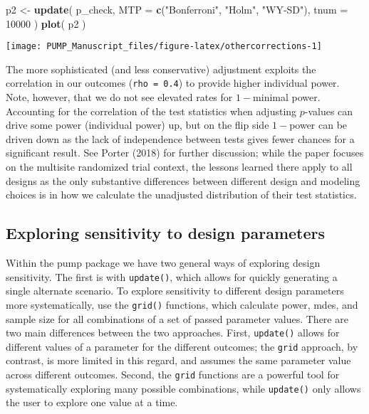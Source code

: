 \documentclass[
]{article}
\newenvironment{Shaded}{\begin{snugshade}}{\end{snugshade}}
\newcommand{\DataTypeTok}[1]{\textcolor[rgb]{0.13,0.29,0.53}{#1}}
\newcommand{\DecValTok}[1]{\textcolor[rgb]{0.00,0.00,0.81}{#1}}
\newcommand{\KeywordTok}[1]{\textcolor[rgb]{0.13,0.29,0.53}{\textbf{#1}}}
\newcommand{\NormalTok}[1]{#1}
\newcommand{\StringTok}[1]{\textcolor[rgb]{0.31,0.60,0.02}{#1}}
\begin{document}
\begin{Shaded}
\begin{Highlighting}[]
\NormalTok{p2 \textless{}{-}}\StringTok{ }\KeywordTok{update}\NormalTok{( p\_check, }\DataTypeTok{MTP =} \KeywordTok{c}\NormalTok{(}\StringTok{"Bonferroni"}\NormalTok{, }\StringTok{"Holm"}\NormalTok{, }\StringTok{"WY{-}SD"}\NormalTok{), }\DataTypeTok{tnum =} \DecValTok{10000}\NormalTok{ )}
\KeywordTok{plot}\NormalTok{( p2 )}
\end{Highlighting}
\end{Shaded}

\begin{center}\texttt{[image: PUMP\_Manuscript\_files/figure-latex/othercorrections-1]} \end{center}

The more sophisticated (and less conservative) adjustment exploits the
correlation in our outcomes (\texttt{rho\ =\ 0.4}) to provide higher
individual power. Note, however, that we do not see elevated rates for
\(1-\)minimal power. Accounting for the correlation of the test
statistics when adjusting \(p\)-values can drive some power (individual
power) up, but on the flip side \(1-\)power can be driven down as the
lack of independence between tests gives fewer chances for a significant
result. See Porter (2018) for further discussion; while the paper
focuses on the multisite randomized trial context, the lessons learned
there apply to all designs as the only substantive differences between
different design and modeling choices is in how we calculate the
unadjusted distribution of their test statistics.

\subsection{Exploring sensitivity to design parameters}

Within the pump package we have two general ways of exploring design
sensitivity. The first is with \texttt{update()}, which allows for
quickly generating a single alternate scenario. To explore sensitivity
to different design parameters more systematically, use the
\texttt{grid()} functions, which calculate power, mdes, and sample size
for all combinations of a set of passed parameter values. There are two
main differences between the two approaches. First, \texttt{update()}
allows for different values of a parameter for the different outcomes;
the \texttt{grid} approach, by contrast, is more limited in this regard,
and assumes the same parameter value across different outcomes. Second,
the \texttt{grid} functions are a powerful tool for systematically
exploring many possible combinations, while \texttt{update()} only
allows the user to explore one value at a time.
\end{document}
